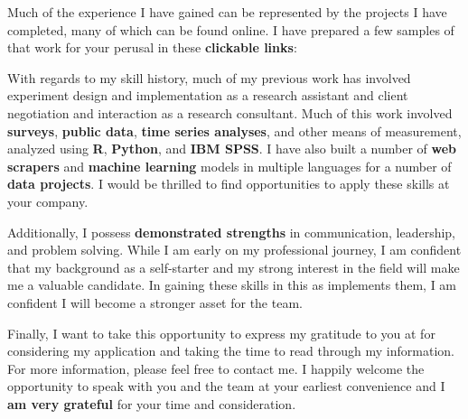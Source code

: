 \documentclass[8pt,a4paper,ragged2e,withhyper]{altacv}
\begin{document}
\begin{changemargin}{0.5cm}{0.7cm}
Much of the experience I have gained can be represented by the projects I have completed, many of which can be found online. I have prepared a few samples of that work for your perusal in these \textbf{clickable links}:\\\medskip
\setlength{\parindent}{0pt}

\setlength{\parindent}{1.5em}

With regards to my skill history, much of my previous work has involved experiment design and implementation as a research assistant and client negotiation and interaction as a research consultant. Much of this work involved \textbf{surveys}, \textbf{public data}, \textbf{time series analyses}, and other means of measurement, analyzed using \textbf{R}, \textbf{Python}, and \textbf{IBM SPSS}. I have also built a number of \textbf{web scrapers} and \textbf{machine learning} models in multiple languages for a number of \textbf{data projects}. I would be thrilled to find opportunities to apply these skills at your company.


Additionally, I possess \textbf{demonstrated strengths} in communication, leadership, and problem solving. While I am early on my professional journey, I am confident that my background as a self-starter and my strong interest in the field will make me a valuable candidate. In gaining these skills in this \jobType{} as \empName{} implements them, I am confident I will become a stronger asset for the team. 


Finally, I want to take this opportunity to express my gratitude to you at \empName{} for considering my application and taking the time to read through my information. For more information, please feel free to contact me. I happily welcome the opportunity to speak with you and the team at your earliest convenience and I \textbf{am very grateful} for your time and consideration. 


\end{changemargin}
\end{document}
